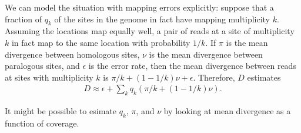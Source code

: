 \documentclass{article}
\begin{document}
We can model the situation with mapping errors explicitly:
suppose that a fraction of $q_k$ of the sites in the genome
in fact have mapping multiplicity $k$.
Assuming the locations map equally well,
a pair of reads at a site of multiplicity $k$ 
in fact map to the same location with probability $1/k$.
If $\pi$ is the mean divergence between homologous sites,
$\nu$ is the mean divergence between paralogous sites,
and $\epsilon$ is the error rate,
then the mean divergence between reads at sites with multiplicity $k$ 
is $\pi/k + (1-1/k) \nu + \epsilon$.
Therefore, $D$ estimates
\begin{align}
  D \approx \epsilon + \sum_k q_k \left( \pi/k + (1-1/k) \nu \right) .
\end{align}

It might be possible to esimate $q_k$, $\pi$, and $\nu$ by looking at mean divergence as a function of coverage.
\end{document}
